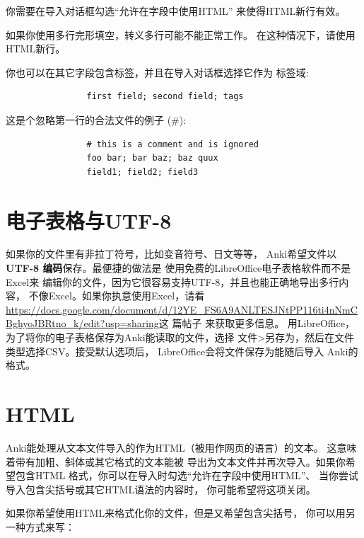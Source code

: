 \documentclass[a4paper]{book}
\begin{document}
			你需要在导入对话框勾选“允许在字段中使用HTML” 来使得HTML新行有效。
			
			\begin{shaded}
				如果你使用多行完形填空，转义多行可能不能正常工作。 在这种情况下，请使用HTML新行。
			\end{shaded}
			
			你也可以在其它字段包含标签，并且在导入对话框选择它作为 标签域:
			
			\begin{shaded}\begin{verbatim}
				first field; second field; tags
				\end{verbatim}\end{shaded}
			
			这是个忽略第一行的合法文件的例子 (\#):
			
			\begin{shaded}\begin{verbatim}
				# this is a comment and is ignored
				foo bar; bar baz; baz quux
				field1; field2; field3
				\end{verbatim}\end{shaded}
			
			\section{电子表格与UTF-8}
			
			如果你的文件里有非拉丁符号，比如变音符号、日文等等， Anki希望文件以
			\textbf{UTF-8 编码}保存。最便捷的做法是 使用免费的LibreOffice电子表格软件而不是Excel来 编辑你的文件，因为它很容易支持UTF-8，并且也能正确地导出多行内容， 不像Excel。如果你执意使用Excel，请看
			\url{https://docs.google.com/document/d/12YE_FS6A9ANLTESJNtPP116ti4nNmCBghyoJBRtno_k/edit?usp=sharing}这
			篇帖子 来获取更多信息。
			用LibreOffice，为了将你的电子表格保存为Anki能读取的文件，选择 文件>另存为，然后在文件类型选择CSV。接受默认选项后， LibreOffice会将文件保存为能随后导入 Anki的格式。
			
			\section{HTML}
			Anki能处理从文本文件导入的作为HTML（被用作网页的语言）的文本。 这意味着带有加粗、斜体或其它格式的文本能被 导出为文本文件并再次导入。如果你希望包含HTML 格式，你可以在导入时勾选“允许在字段中使用HTML”、 当你尝试导入包含尖括号或其它HTML语法的内容时， 你可能希望将这项关闭。
			
			如果你希望使用HTML来格式化你的文件，但是又希望包含尖括号， 你可以用另一种方式来写：
			
\end{document}
